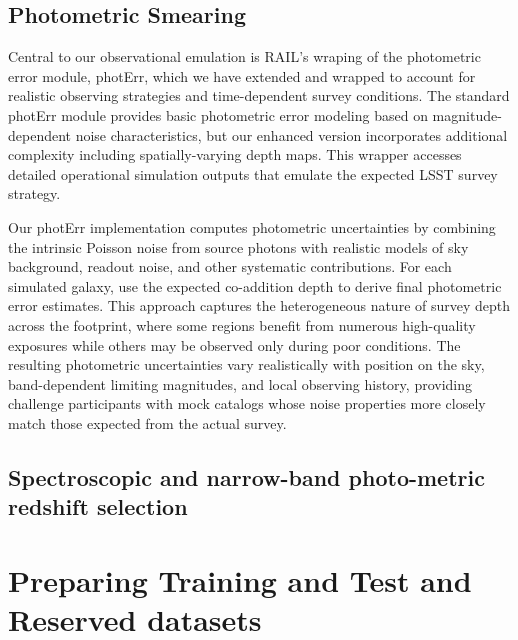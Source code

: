 \documentclass[modern]{desc-tex/styles/lsstdescnote}
\begin{document}
\subsection{Photometric Smearing}

Central to our observational emulation is RAIL's wraping of the
photometric error module, photErr, which we have extended and wrapped
to account for realistic observing strategies and time-dependent
survey conditions. The standard photErr module provides basic
photometric error modeling based on magnitude-dependent noise
characteristics, but our enhanced version incorporates additional
complexity including spatially-varying depth maps. This
wrapper accesses detailed operational simulation outputs that emulate
the expected LSST survey strategy.

Our photErr implementation computes photometric uncertainties by
combining the intrinsic Poisson noise from source photons with
realistic models of sky background, readout noise, and other
systematic contributions.  For each simulated galaxy, use the expected
co-addition depth to derive final photometric error estimates. This
approach captures the heterogeneous nature of survey depth across the
footprint, where some regions benefit from numerous high-quality
exposures while others may be observed only during poor
conditions. The resulting photometric uncertainties vary realistically
with position on the sky, band-dependent limiting magnitudes, and
local observing history, providing challenge participants with mock
catalogs whose noise properties more closely match those expected from
the actual survey.

\subsection{Spectroscopic and narrow-band photo-metric redshift selection}




\section{Preparing Training and Test and Reserved datasets}
\end{document}
